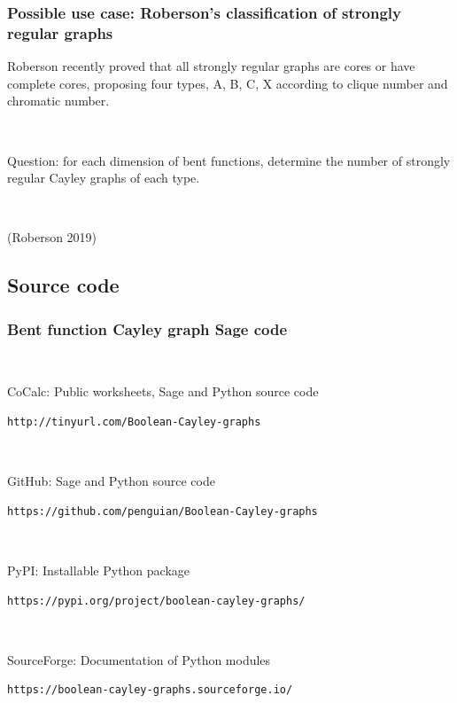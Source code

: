 \documentclass[pdf,sprung,slideColor,nocolorBG]{beamer}
\newenvironment{colortheme}[1]{
\def\ProvidesPackageRCS $##1${\relax}
\renewcommand{\ProcessOptions}{\relax}
\makeatletter

\makeatother
}{}
\newcommand{\slidecite}[1]{\tiny{(#1)}\normalsize{}}
\begin{document}
\begin{colortheme}{jubata}
\begin{frame}
\frametitle{Possible use case: Roberson's classification of strongly regular graphs}

Roberson recently proved that all strongly regular graphs are cores or have complete cores, proposing four types, A, B, C, X according to clique number and chromatic number.

~

Question: for each dimension of bent functions, determine the number of strongly regular Cayley graphs of each type.

~

\slidecite{Roberson 2019}
\end{frame}

\end{colortheme}

\subsection{Source code}

\begin{colortheme}{jubata}

\begin{frame}[fragile]
\frametitle{Bent function Cayley graph Sage code}
~

CoCalc: Public worksheets, Sage and Python source code

\begin{verbatim}
http://tinyurl.com/Boolean-Cayley-graphs
\end{verbatim}

~

GitHub: Sage and Python source code

\begin{verbatim}
https://github.com/penguian/Boolean-Cayley-graphs
\end{verbatim}

~

PyPI: Installable Python package


\begin{verbatim}
https://pypi.org/project/boolean-cayley-graphs/
\end{verbatim}

~

SourceForge: Documentation of Python modules

\begin{verbatim}
https://boolean-cayley-graphs.sourceforge.io/
\end{verbatim}

\end{frame}

\end{colortheme}
\end{document}
